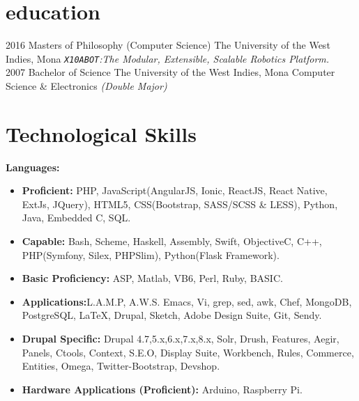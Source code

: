\documentclass[]{friggeri-cv} %
\begin{document}
\section{education}

\begin{entrylist}
\entry
{2016}
{Masters {\normalfont of Philosophy (Computer Science)}}
{The University of the West Indies, Mona}
{\emph{\texttt{X10ABOT}:The Modular, Extensible, Scalable Robotics Platform.}} \\
\entry
{2007}
{Bachelor {\normalfont of Science}}
{The University of the West Indies, Mona}
{Computer Science \& Electronics \emph{(Double Major)}}
\end{entrylist}


\section{Technological Skills}
\textbf{Languages:}
\begin{itemize}
\item \textbf{Proficient: }PHP, JavaScript(AngularJS, Ionic, ReactJS, React Native, ExtJs, JQuery), HTML5, CSS(Bootstrap, SASS/SCSS \& LESS), Python, Java, Embedded C, SQL.
\item \textbf{Capable: }Bash, Scheme, Haskell, Assembly, Swift, Objective\-C, C++, PHP(Symfony, Silex, PHPSlim), Python(Flask Framework).
\item \textbf{Basic Proficiency: }ASP, Matlab, VB6, Perl, Ruby, BASIC.
\item \textbf{Applications:}L.A.M.P, A.W.S. Emacs, Vi, grep, sed, awk, Chef, MongoDB, PostgreSQL, \LaTeX, Drupal, Sketch, Adobe Design Suite, Git, Sendy.
\item \textbf{Drupal Specific: } Drupal 4.7,5.x,6.x,7.x,8.x, Solr, Drush, Features, Aegir, Panels, Ctools, Context, S.E.O, Display Suite, Workbench, Rules, Commerce, Entities, Omega, Twitter-Bootstrap, Devshop.
\item \textbf{Hardware Applications (Proficient):} Arduino, Raspberry Pi.
\end{itemize}
\end{document}
